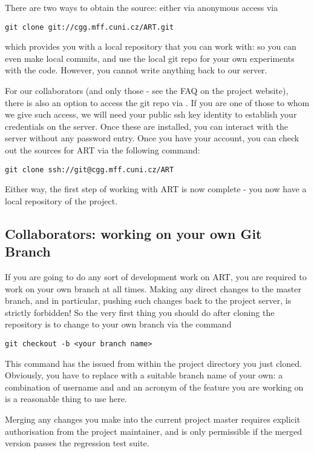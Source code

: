 There are two ways to obtain the source: either via anonymous  access via

\begin{verbatim}
git clone git://cgg.mff.cuni.cz/ART.git
\end{verbatim}

which provides you with a local repository that you can work with: so you can even make local commits, and use the local git repo for your own experiments with the code. However, you cannot write anything back to our server.

For our collaborators (and only those - see the FAQ on the project website), there is also an option to access the git repo via . If you are one of those to whom we give such access, we will need your public ssh key identity to establish your credentials on the server. Once these are installed, you can interact with the server without any password entry. Once you have your account, you can check out the sources for ART via the following command:
\begin{verbatim}
git clone ssh://git@cgg.mff.cuni.cz/ART
\end{verbatim}

Either way, the first step of working with ART is now complete - you now have a local repository of
the project.

\subsection{Collaborators: working on your own Git Branch}
\label{sec:forking}
If you are going to do any sort of development work on ART, you are required to work on your own branch at all times. Making any direct changes to the master branch, and in particular, pushing such changes back to the project server, is strictly forbidden! So the very first thing you should do after cloning the repository is to change to your own branch via the command
\begin{verbatim}
git checkout -b <your branch name>
\end{verbatim}
This command has the issued from within the project directory you just cloned. Obviously, you have to replace  with a suitable branch name of your own: a combination of username and and an acronym of the feature you are working on is a reasonable thing to use here.

Merging any changes you make into the current project master requires explicit authorisation from the project maintainer, and is only permissible if the merged version passes the regression test suite.

